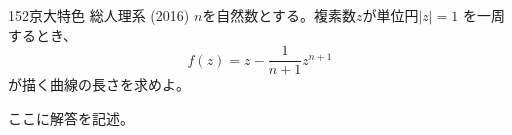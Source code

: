 \begin{prob}{152}{\maru}{京大特色 総人理系 (2016)}
 $n$を自然数とする。複素数$z$が単位円$|z|=1$ を一周するとき、
 \[ f(z) = z - \frac{1}{n+1}z^{n+1} \]
 が描く曲線の長さを求めよ。
\end{prob}
ここに解答を記述。
